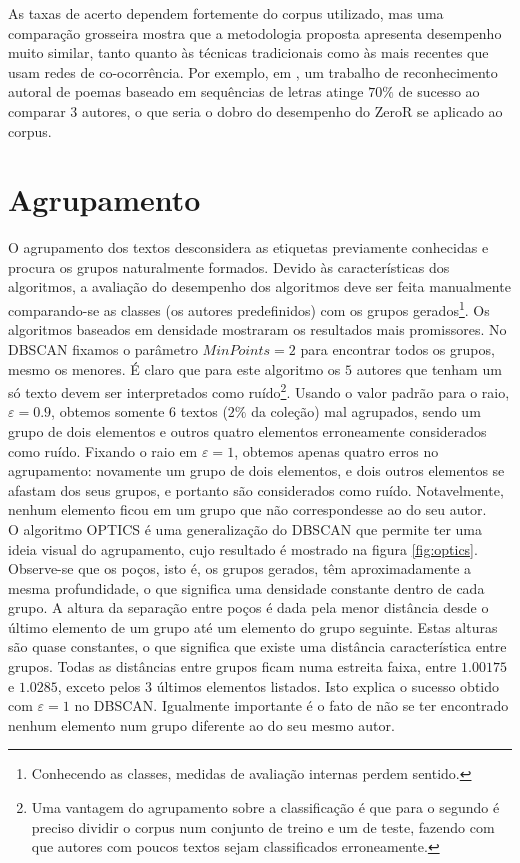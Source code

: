 \documentclass[a4paper,openright,12pt]{report} %
\begin{document}
As taxas de acerto dependem fortemente do corpus utilizado, mas uma compara\c c\~ao grosseira mostra que a metodologia proposta apresenta desempenho muito similar, tanto quanto \`as t\'ecnicas tradicionais como \`as mais recentes que usam redes de co-ocorr\^encia. Por exemplo, em \cite{hoorn1999neural}, um trabalho de reconhecimento autoral de poemas baseado em sequ\^encias de letras atinge $70\%$ de sucesso ao comparar $3$ autores, o que seria o dobro do desempenho do \textrm{ZeroR} se aplicado ao corpus.\\


\section{Agrupamento}

O agrupamento dos textos desconsidera as etiquetas previamente conhecidas e procura os grupos naturalmente formados. Devido \`as caracter\'isticas dos algoritmos, a avalia\c c\~ao do desempenho dos algoritmos deve ser feita manualmente comparando-se as classes (os autores predefinidos) com os grupos gerados\footnote{Conhecendo as classes, medidas de avalia\c c\~ao internas perdem sentido.}. Os algoritmos baseados em densidade mostraram os resultados mais promissores. No DBSCAN fixamos o par\^ametro $MinPoints=2$ para encontrar todos os grupos, mesmo os menores. \'E claro que para este algoritmo os $5$ autores que tenham um s\'o texto devem ser interpretados como ru\'ido\footnote{Uma vantagem do agrupamento sobre a classifica\c c\~ao \'e que para o segundo \'e preciso dividir o corpus num conjunto de treino e um de teste, fazendo com que autores com poucos textos sejam classificados erroneamente.}. Usando o valor padr\~ao para o raio, $\varepsilon=0.9$, obtemos somente $6$ textos ($2\%$ da cole\c c\~ao) mal agrupados, sendo um grupo de dois elementos e outros quatro elementos erroneamente considerados como ru\'ido. Fixando o raio em $\varepsilon=1$, obtemos apenas quatro erros no agrupamento: novamente um grupo de dois elementos, e dois outros elementos se afastam dos seus grupos, e portanto s\~ao considerados como ru\'ido. Notavelmente, nenhum elemento ficou em um grupo que n\~ao correspondesse ao do seu autor.\\

O algoritmo OPTICS \'e uma generaliza\c c\~ao do DBSCAN que permite ter uma ideia visual do agrupamento, cujo resultado \'e mostrado na figura \ref{fig:optics}. Observe-se que os po\c cos, isto \'e, os grupos gerados, t\^em aproximadamente a mesma profundidade, o que significa uma densidade constante dentro de cada grupo. A altura da separa\c c\~ao entre po\c cos \'e dada pela menor dist\^ancia desde o \'ultimo elemento de um grupo at\'e um elemento do grupo seguinte. Estas alturas s\~ao quase constantes, o que significa que existe uma dist\^ancia caracter\'istica entre grupos. Todas as dist\^ancias entre grupos ficam numa estreita faixa, entre $1.00175$ e $1.0285$, exceto pelos $3$ \'ultimos elementos listados. Isto explica o sucesso obtido com $\varepsilon=1$ no DBSCAN. Igualmente importante \'e o fato de n\~ao se ter encontrado nenhum elemento num grupo diferente ao do seu mesmo autor.\\
\end{document}
